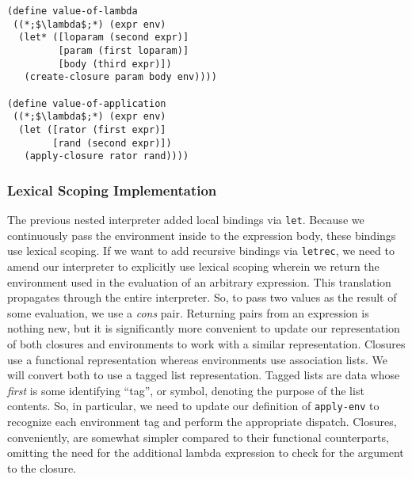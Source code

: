 \begin{cl}[]{}\begin{lstlisting}[language=MyScheme]
(define value-of-lambda
 ((*;$\lambda$;*) (expr env)
  (let* ([loparam (second expr)]
         [param (first loparam)]
         [body (third expr)])
   (create-closure param body env))))

(define value-of-application
 ((*;$\lambda$;*) (expr env)
  (let ([rator (first expr)]
        [rand (second expr)])
   (apply-closure rator rand))))
\end{lstlisting}\end{cl}

\subsubsection*{Lexical Scoping Implementation}

The previous nested interpreter added local bindings via \texttt{let}. Because we continuously pass the environment inside to the expression body, these bindings use lexical scoping. If we want to add recursive bindings via \texttt{letrec}, we need to amend our interpreter to explicitly use lexical scoping wherein we return the environment used in the evaluation of an arbitrary expression. This translation propagates through the entire interpreter. So, to pass two values as the result of some evaluation, we use a \textit{cons} pair. Returning pairs from an expression is nothing new, but it is significantly more convenient to update our representation of both closures and environments to work with a similar representation. Closures use a functional representation whereas environments use association lists. We will convert both to use a tagged list representation. Tagged lists are data whose \textit{first} is some identifying ``tag'', or symbol, denoting the purpose of the list contents. So, in particular, we need to update our definition of \texttt{apply-env} to recognize each environment tag and perform the appropriate dispatch. Closures, conveniently, are somewhat simpler compared to their functional counterparts, omitting the need for the additional lambda expression to check for the argument to the closure.

